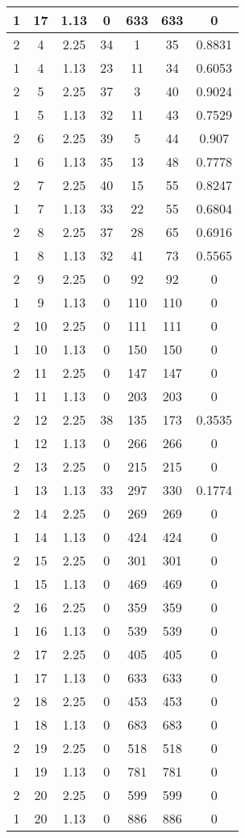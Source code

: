 \documentclass[letterpaper, 12pt]{article}
\begin{document}
\begin{longtable}{|c|c|c|c|c|c|c|}
1 & 17 & 1.13 & 0 & 633 & 633 & 0 \\
\hline
2 & 4 & 2.25 & 34 & 1 & 35 & 0.8831 \\
\hline
1 & 4 & 1.13 & 23 & 11 & 34 & 0.6053 \\
\hline
2 & 5 & 2.25 & 37 & 3 & 40 & 0.9024 \\
\hline
1 & 5 & 1.13 & 32 & 11 & 43 & 0.7529 \\
\hline
2 & 6 & 2.25 & 39 & 5 & 44 & 0.907 \\
\hline
1 & 6 & 1.13 & 35 & 13 & 48 & 0.7778 \\
\hline
2 & 7 & 2.25 & 40 & 15 & 55 & 0.8247 \\
\hline
1 & 7 & 1.13 & 33 & 22 & 55 & 0.6804 \\
\hline
2 & 8 & 2.25 & 37 & 28 & 65 & 0.6916 \\
\hline
1 & 8 & 1.13 & 32 & 41 & 73 & 0.5565 \\
\hline
2 & 9 & 2.25 & 0 & 92 & 92 & 0 \\
\hline
1 & 9 & 1.13 & 0 & 110 & 110 & 0 \\
\hline
2 & 10 & 2.25 & 0 & 111 & 111 & 0 \\
\hline
1 & 10 & 1.13 & 0 & 150 & 150 & 0 \\
\hline
2 & 11 & 2.25 & 0 & 147 & 147 & 0 \\
\hline
1 & 11 & 1.13 & 0 & 203 & 203 & 0 \\
\hline
2 & 12 & 2.25 & 38 & 135 & 173 & 0.3535 \\
\hline
1 & 12 & 1.13 & 0 & 266 & 266 & 0 \\
\hline
2 & 13 & 2.25 & 0 & 215 & 215 & 0 \\
\hline
1 & 13 & 1.13 & 33 & 297 & 330 & 0.1774 \\
\hline
2 & 14 & 2.25 & 0 & 269 & 269 & 0 \\
\hline
1 & 14 & 1.13 & 0 & 424 & 424 & 0 \\
\hline
2 & 15 & 2.25 & 0 & 301 & 301 & 0 \\
\hline
1 & 15 & 1.13 & 0 & 469 & 469 & 0 \\
\hline
2 & 16 & 2.25 & 0 & 359 & 359 & 0 \\
\hline
1 & 16 & 1.13 & 0 & 539 & 539 & 0 \\
\hline
2 & 17 & 2.25 & 0 & 405 & 405 & 0 \\
\hline
1 & 17 & 1.13 & 0 & 633 & 633 & 0 \\
\hline
2 & 18 & 2.25 & 0 & 453 & 453 & 0 \\
\hline
1 & 18 & 1.13 & 0 & 683 & 683 & 0 \\
\hline
2 & 19 & 2.25 & 0 & 518 & 518 & 0 \\
\hline
1 & 19 & 1.13 & 0 & 781 & 781 & 0 \\
\hline
2 & 20 & 2.25 & 0 & 599 & 599 & 0 \\
\hline
1 & 20 & 1.13 & 0 & 886 & 886 & 0 \\
\hline
\end{longtable}
\end{document}
